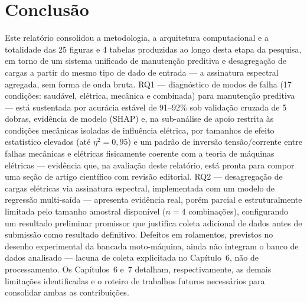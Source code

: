 \documentclass[12pt,a4paper]{report}
\begin{document}
\chapter{Conclusão}

Este relatório consolidou a metodologia, a arquitetura computacional e a
totalidade das 25 figuras e 4 tabelas produzidas ao longo desta etapa da
pesquisa, em torno de um sistema unificado de manutenção preditiva e
desagregação de cargas a partir do mesmo tipo de dado de entrada — a
assinatura espectral agregada, sem forma de onda bruta. RQ1 — diagnóstico de
modos de falha (17 condições: saudável, elétrica, mecânica e combinada) para
manutenção preditiva — está sustentada por acurácia estável de 91--92\% sob
validação cruzada de 5 dobras, evidência de modelo (SHAP) e, na sub-análise
de apoio restrita às condições mecânicas isoladas de influência elétrica, por
tamanhos de efeito estatístico elevados (até $\eta^2=0{,}95$) e um padrão de
inversão tensão/corrente entre falhas mecânicas e elétricas fisicamente
coerente com a teoria de máquinas elétricas — evidência que, na avaliação
deste relatório, está pronta para compor uma seção de artigo científico com
revisão editorial. RQ2 — desagregação de cargas elétricas via assinatura
espectral, implementada com um modelo de regressão multi-saída — apresenta
evidência real, porém parcial e estruturalmente limitada pelo tamanho
amostral disponível ($n=4$ combinações), configurando um resultado
preliminar promissor que justifica coleta adicional de dados antes de
submissão como resultado definitivo. Defeitos em rolamentos, previstos no
desenho experimental da bancada moto-máquina, ainda não integram o banco de
dados analisado — lacuna de coleta explicitada no Capítulo~6, não de
processamento. Os Capítulos~6 e~7 detalham, respectivamente, as demais
limitações identificadas e o roteiro de trabalhos futuros necessários para
consolidar ambas as contribuições.
\end{document}
